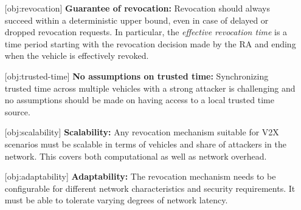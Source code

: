 \begin{enumerate}
  \item[{\crtcrossreflabel{\textbf{O1}}[obj:revocation]}] \textbf{Guarantee of
  revocation:} Revocation should always succeed within a deterministic upper
  bound, even in case of delayed or dropped revocation requests. In particular,
  the \textit{effective revocation time} is a time period starting with the
  revocation decision made by the \ac{RA} and ending when the vehicle is
  effectively revoked.
  \item[{\crtcrossreflabel{\textbf{O2}}[obj:trusted-time]}] \textbf{No
  assumptions on trusted time:} Synchronizing trusted time across multiple
  vehicles with a strong attacker is challenging and no assumptions should be
  made on having access to a local trusted time source.
  \item[{\crtcrossreflabel{\textbf{O3}}[obj:scalability]}] \textbf{Scalability:}
    Any revocation mechanism suitable for \ac{V2X} scenarios must be scalable in
    terms of vehicles and share of attackers in the network. This covers both
    computational as well as network overhead.
  \item[{\crtcrossreflabel{\textbf{O4}}[obj:adaptability]}]
  \textbf{Adaptability:} The revocation mechanism needs to be configurable for
  different network characteristics and security requirements. It must be able
  to tolerate varying degrees of network latency.
\end{enumerate}

